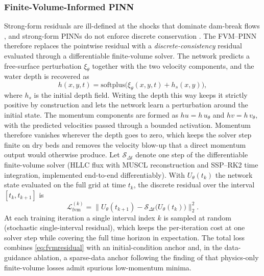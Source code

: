 \documentclass[12pt]{article}
\newenvironment{newtext}{\par\color{red}}{\par}
\begin{document}
\begin{newtext}
\subsubsection{Finite-Volume-Informed PINN}

Strong-form residuals are ill-defined at the shocks that dominate dam-break flows \cite{mao2020highspeed,oubarka2026wepinn}, and strong-form PINNs do not enforce discrete conservation \cite{liu2026fvmpinn}. The FVM--PINN therefore replaces the pointwise residual with a \emph{discrete-consistency} residual evaluated through a differentiable finite-volume solver. The network predicts a free-surface perturbation $\xi_\theta$ together with the two velocity components, and the water depth is recovered as
\begin{equation}
h(x,y,t) = \mathrm{softplus}\bigl(\xi_\theta(x,y,t) + h_s(x,y)\bigr),
\label{eq:softplus_depth}
\end{equation}
where $h_s$ is the initial depth field. Writing the depth this way keeps it strictly positive by construction and lets the network learn a perturbation around the initial state. The momentum components are formed as $hu = h\,u_\theta$ and $hv = h\,v_\theta$, with the predicted velocities passed through a bounded activation. Momentum therefore vanishes wherever the depth goes to zero, which keeps the solver step finite on dry beds and removes the velocity blow-up that a direct momentum output would otherwise produce. Let $\mathcal{S}_{\Delta t}$ denote one step of the differentiable finite-volume solver (HLLC flux with MUSCL reconstruction and SSP--RK2 time integration, implemented end-to-end differentiably). With $U_\theta(t_k)$ the network state evaluated on the full grid at time $t_k$, the discrete residual over the interval $[t_k, t_{k+1}]$ is
\begin{equation}
\mathcal{L}_{\mathrm{fvm}}^{(k)}
=
\bigl\lVert
U_\theta(t_{k+1})
-
\mathcal{S}_{\Delta t}\bigl(U_\theta(t_k)\bigr)
\bigr\rVert_2^2 .
\label{eq:fvmresidual}
\end{equation}
At each training iteration a single interval index $k$ is sampled at random (stochastic single-interval residual), which keeps the per-iteration cost at one solver step while covering the full time horizon in expectation. The total loss combines \cref{eq:fvmresidual} with an initial-condition anchor and, in the data-guidance ablation, a sparse-data anchor following the finding of \cite{liu2026fvmpinn} that physics-only finite-volume losses admit spurious low-momentum minima.


\end{newtext}
\end{document}
